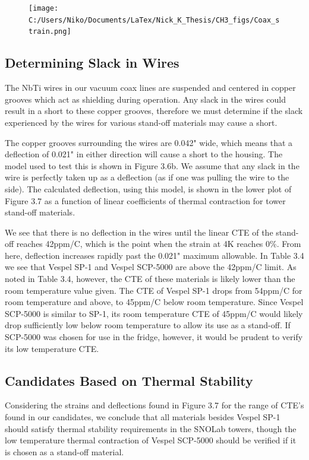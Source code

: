 \documentclass{report}
\begin{document}
\begin{figure}[ht]
\centering
\texttt{[image: C:/Users/Niko/Documents/LaTex/Nick\_K\_Thesis/CH3\_figs/Coax\_strain.png]}
\caption{}
\end{figure}

\subsection{Determining Slack in Wires}

The NbTi wires in our vacuum coax lines are suspended and centered in copper grooves which act as shielding during operation. Any slack in the wires could result in a short to these copper grooves, therefore we must determine if the slack experienced by the wires for various stand-off materials may cause a short.

The copper grooves surrounding the wires are 0.042" wide, which means that a deflection of 0.021" in either direction will cause a short to the housing. The model used to test this is shown in Figure 3.6b. We assume that any slack in the wire is perfectly taken up as a deflection (as if one was pulling the wire to the side). The calculated deflection, using this model, is shown in the lower plot of Figure 3.7 as a function of linear coefficients of thermal contraction for tower stand-off materials.

We see that there is no deflection in the wires until the linear CTE of the stand-off reaches 42ppm/C, which is the point when the strain at 4K reaches 0\%. From here, deflection increases rapidly past the 0.021" maximum allowable. In Table 3.4 we see that Vespel SP-1 and Vespel SCP-5000 are above the 42ppm/C limit. As noted in Table 3.4, however, the CTE of these materials is likely lower than the room temperature value given. The CTE of Vespel SP-1 drops from 54ppm/C for room temperature and above, to 45ppm/C below room temperature. Since Vespel SCP-5000 is similar to SP-1, its room temperature CTE of 45ppm/C would likely drop sufficiently low below room temperature to allow its use as a stand-off. If SCP-5000 was chosen for use in the fridge, however, it would be prudent to verify its low temperature CTE.

\subsection{Candidates Based on Thermal Stability}
Considering the strains and deflections found in Figure 3.7 for the range of CTE's found in our candidates, we conclude that all materials besides Vespel SP-1 should satisfy thermal stability requirements in the SNOLab towers, though the low temperature thermal contraction of Vespel SCP-5000 should be verified if it is chosen as a stand-off material.
\end{document}
